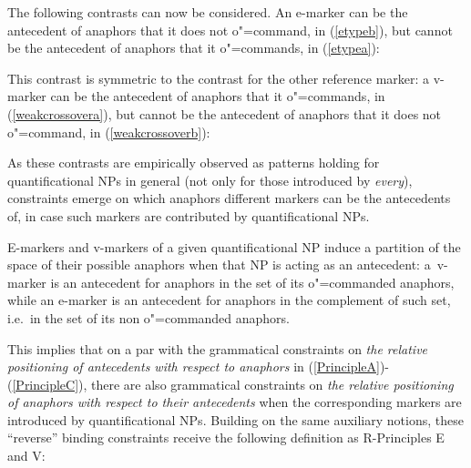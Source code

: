 \documentclass[output=paper
	        ,collection
	        ,collectionchapter
 	        ,biblatex
                ,babelshorthands
                ,newtxmath
                ,draftmode
                ,colorlinks, citecolor=brown
]{langscibook}
\begin{document}
The following contrasts can now be considered. An e-marker can be the
antecedent of anaphors that it does not o"=command, in (\ref{etypeb}), but
cannot be the antecedent of anaphors that it o"=commands, in (\ref{etypea}):

\begin{exe}
\ex\label{etype}
\begin{xlist}
\label{etypea}
\label{etypeb}
\end{xlist}
\end{exe}

This contrast is symmetric to the contrast for the other reference marker: a v-marker 
can be the antecedent of anaphors that it o"=commands, in (\ref{weakcrossovera}), but
cannot be the antecedent of anaphors that it 
does not o"=command, in (\ref{weakcrossoverb}):

\begin{exe}
\ex\label{weakcrossover}
\begin{xlist}
\label{weakcrossovera}
\label{weakcrossoverb}
\end{xlist}
\end{exe}

As these contrasts are empirically observed as patterns holding for quantificational NPs
in general (not only for those introduced by {\em every}), 
constraints emerge on which anaphors different markers can be the antecedents 
of, in case such markers are contributed by quantificational NPs.

E-markers and v-markers of a given quantificational NP induce a partition of the
space of their possible anaphors when that NP is acting as an
antecedent:  a~\mbox{v-marker}
is an antecedent for anaphors in the set of its o"=commanded anaphors, while  
an e-marker is an antecedent for anaphors in the complement of such set, i.e.\ in 
the set of its non o"=commanded anaphors.

This implies that on a par with the grammatical constraints on {\em the relative
positioning of antecedents with respect to anaphors} in (\ref{PrincipleA})-(\ref{PrincipleC}), 
there are also grammatical constraints on {\em the relative positioning 
of anaphors with respect to their antecedents} when
the corresponding markers are introduced by quantificational NPs. 
Building on the same auxiliary notions, these ``reverse'' binding
constraints receive the following definition as R-Principles E and V:
\end{document}
